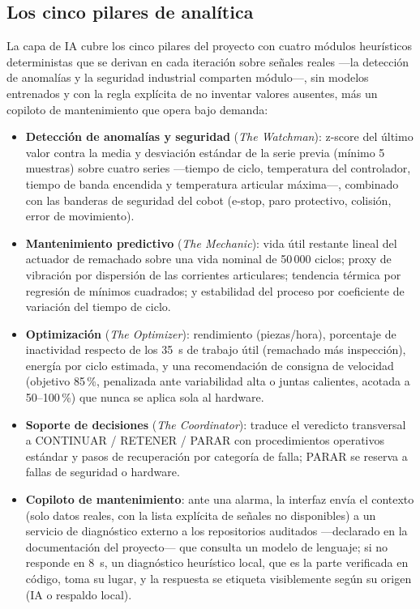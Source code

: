 \documentclass{styles/svproc}
\begin{document}
\subsection{Los cinco pilares de analítica}
La capa de IA cubre los cinco pilares del proyecto con cuatro módulos
heurísticos deterministas que se derivan en cada iteración sobre señales
reales ---la detección de anomalías y la seguridad industrial comparten
módulo---, sin modelos entrenados y con la regla explícita de no inventar
valores ausentes, más un copiloto de mantenimiento que opera bajo demanda:
\begin{itemize}
  \item \textbf{Detección de anomalías y seguridad} (\emph{The Watchman}):
        z-score del último valor contra la media y desviación estándar de la
        serie previa (mínimo 5 muestras) sobre cuatro series ---tiempo de
        ciclo, temperatura del controlador, tiempo de banda encendida y
        temperatura articular máxima---, combinado con las banderas de
        seguridad del cobot (e-stop, paro protectivo, colisión, error de
        movimiento).
  \item \textbf{Mantenimiento predictivo} (\emph{The Mechanic}): vida útil
        restante lineal del actuador de remachado sobre una vida nominal de
        50\,000 ciclos; proxy de vibración por dispersión de las corrientes
        articulares; tendencia térmica por regresión de mínimos cuadrados; y
        estabilidad del proceso por coeficiente de variación del tiempo de
        ciclo.
  \item \textbf{Optimización} (\emph{The Optimizer}): rendimiento
        (piezas/hora), porcentaje de inactividad respecto de los
        \SI{35}{\second} de trabajo útil (remachado más inspección), energía
        por ciclo estimada, y una recomendación de consigna de velocidad
        (objetivo 85\,\%, penalizada ante variabilidad alta o juntas
        calientes, acotada a 50--100\,\%) que nunca se aplica sola al
        hardware.
  \item \textbf{Soporte de decisiones} (\emph{The Coordinator}): traduce el
        veredicto transversal a CONTINUAR / RETENER / PARAR con
        procedimientos operativos estándar y pasos de recuperación por
        categoría de falla; PARAR se reserva a fallas de seguridad o
        hardware.
  \item \textbf{Copiloto de mantenimiento}: ante una alarma, la interfaz
        envía el contexto (solo datos reales, con la lista explícita de
        señales no disponibles) a un servicio de diagnóstico externo a los
        repositorios auditados ---declarado en la documentación del
        proyecto--- que consulta un modelo de lenguaje; si no responde en
        \SI{8}{\second}, un diagnóstico heurístico local, que es la parte
        verificada en código, toma su lugar, y la respuesta se etiqueta
        visiblemente según su origen (IA o respaldo local).
\end{itemize}
\end{document}
